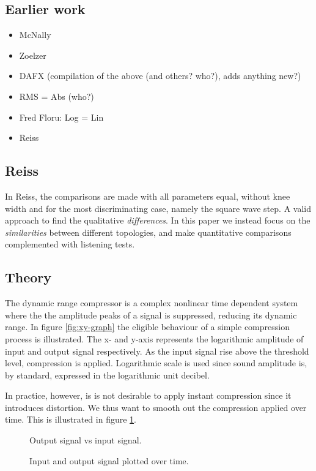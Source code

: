 \subsection{Earlier work}

\begin{itemize}
\item McNally
\item Zoelzer
\item DAFX (compilation of the above (and others? who?), adds anything new?)
\item RMS = Abs (who?)
\item Fred Floru: Log = Lin
\item Reiss
\end{itemize}

\subsection{Reiss}
In Reiss, the comparisons are made with all parameters equal, without knee width and for the most discriminating case, namely the square wave step. A valid approach to find the qualitative \emph{differences}. In this paper we instead focus on the \emph{similarities} between different topologies, and make quantitative comparisons complemented with listening tests.

\subsection{Theory}
The dynamic range compressor is a complex nonlinear time dependent system where the the amplitude peaks of a signal is suppressed, reducing its dynamic range. In figure \ref{fig:xy-graph} the eligible behaviour of a simple compression process is illustrated. The x- and y-axis represents the logarithmic amplitude of input and output signal respectively. As the input signal rise above the threshold level, compression is applied. Logarithmic scale is used since sound amplitude is, by standard, expressed in the logarithmic unit decibel.

In practice, however, is is not desirable to apply instant compression since it introduces distortion\cite{giannoullis}. We thus want to smooth out the compression applied over time. This is illustrated in figure \ref{fig:envelope-graph}.

\begin{figure}[ht]
\captionsetup{justification=centering}
\begin{minipage}[t]{.5\textwidth}
 \centering

\caption{Output signal vs input signal.} 
\label{fig:xy-graph}
\end{minipage}%
\begin{minipage}[t]{.5\textwidth}
\centering

\caption{Input and output signal plotted over time. } 
\label{fig:envelope-graph}
\end{minipage}
\end{figure}

